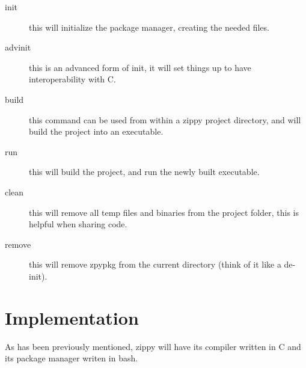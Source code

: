 \documentclass[a4paper,12pt]{article}
\begin{document}
{\begin{description}
	\item[init] this will initialize the package manager, creating the needed files.
	\item[advinit] this is an advanced form of init, it will set things up to have interoperability with C.
	\item[build] this command can be used from within a zippy project directory, and will build the project into an executable.
	\item[run] this will build the project, and run the newly built executable.
	\item[clean] this will remove all temp files and binaries from the project folder, this is helpful when sharing code.
	\item[remove] this will remove zpypkg from the current directory (think of it like a de-init).
\end{description}

\section{Implementation}
As has been previously mentioned, zippy will have its compiler written in C and its package manager writen in bash.


}
\end{document}
